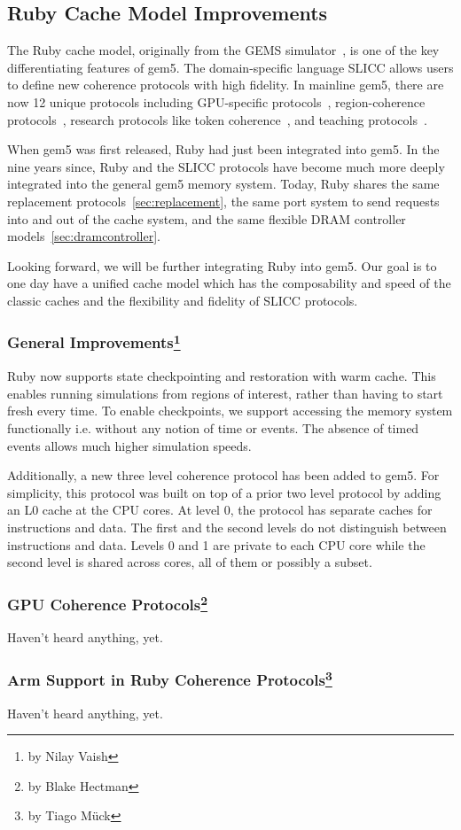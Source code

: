 \subsection[Ruby Cache Model Improvements]{Ruby Cache Model Improvements}
\label{sec:ruby}

The Ruby cache model, originally from the GEMS simulator~\cite{}, is one of the key differentiating features of gem5.
The domain-specific language SLICC allows users to define new coherence protocols with high fidelity.
In mainline gem5, there are now 12 unique protocols including GPU-specific protocols~\cite{viper}, region-coherence protocols~\cite{Power2012hsc}, research protocols like token coherence~\cite{token-coherence}, and teaching protocols~\cite{coherence-primer}.

When gem5 was first released, Ruby had just been integrated into gem5.
In the nine years since, Ruby and the SLICC protocols have become much more deeply integrated into the general gem5 memory system.
Today, Ruby shares the same replacement protocols~\ref{sec:replacement}, the same port system to send requests into and out of the cache system, and the same flexible DRAM controller models~\ref{sec:dramcontroller}.

Looking forward, we will be further integrating Ruby into gem5.
Our goal is to one day have a unified cache model which has the composability and speed of the classic caches and the flexibility and fidelity of SLICC protocols.

\subsubsection[General Improvements]{General Improvements\footnote{by Nilay Vaish}}

Ruby now supports state checkpointing and restoration with warm cache.
This enables running simulations from regions of interest, rather than having to start fresh every time.
To enable checkpoints, we support accessing the memory system functionally i.e. without any notion of time or events.
The absence of timed events allows much higher simulation speeds.

Additionally, a new three level coherence protocol has been added to gem5.
For simplicity, this protocol was built on top of a prior two level protocol by adding an L0 cache at the CPU cores.
At level 0, the protocol has separate caches for instructions and data.
The first and the second levels do not distinguish between instructions and data.
Levels 0 and 1 are private to each CPU core while the second level is shared across cores, all of them or possibly a subset.

\subsubsection[GPU Coherence Protocols]{GPU Coherence Protocols\footnote{by Blake Hectman}}

Haven't heard anything, yet.

\subsubsection[Arm Support and Extensions]{Arm Support in Ruby Coherence Protocols\footnote{by Tiago M{\"u}ck}}

Haven't heard anything, yet.
